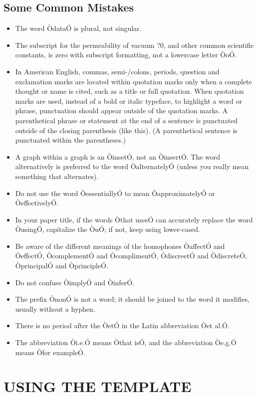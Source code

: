 \documentclass[letterpaper, 10 pt, conference]{ieeeconf}  %
\begin{document}
\subsection{Some Common Mistakes}
\begin{itemize}


\item The word ÒdataÓ is plural, not singular.
\item The subscript for the permeability of vacuum ?0, and other common scientific constants, is zero with subscript formatting, not a lowercase letter ÒoÓ.
\item In American English, commas, semi-/colons, periods, question and exclamation marks are located within quotation marks only when a complete thought or name is cited, such as a title or full quotation. When quotation marks are used, instead of a bold or italic typeface, to highlight a word or phrase, punctuation should appear outside of the quotation marks. A parenthetical phrase or statement at the end of a sentence is punctuated outside of the closing parenthesis (like this). (A parenthetical sentence is punctuated within the parentheses.)
\item A graph within a graph is an ÒinsetÓ, not an ÒinsertÓ. The word alternatively is preferred to the word ÒalternatelyÓ (unless you really mean something that alternates).
\item Do not use the word ÒessentiallyÓ to mean ÒapproximatelyÓ or ÒeffectivelyÓ.
\item In your paper title, if the words Òthat usesÓ can accurately replace the word ÒusingÓ, capitalize the ÒuÓ; if not, keep using lower-cased.
\item Be aware of the different meanings of the homophones ÒaffectÓ and ÒeffectÓ, ÒcomplementÓ and ÒcomplimentÓ, ÒdiscreetÓ and ÒdiscreteÓ, ÒprincipalÓ and ÒprincipleÓ.
\item Do not confuse ÒimplyÓ and ÒinferÓ.
\item The prefix ÒnonÓ is not a word; it should be joined to the word it modifies, usually without a hyphen.
\item There is no period after the ÒetÓ in the Latin abbreviation Òet al.Ó.
\item The abbreviation Òi.e.Ó means Òthat isÓ, and the abbreviation Òe.g.Ó means Òfor exampleÓ.

\end{itemize}


\section{USING THE TEMPLATE}
\end{document}
